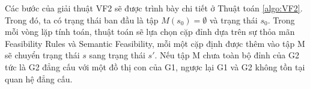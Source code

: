 \documentclass[12pt]{report}
\newenvironment{thuattoan}[1][h]
  {\renewcommand{\algorithmcfname}{Thuật toán}
   \begin{algorithm}[#1]
  }{\end{algorithm}}
\begin{document}
\newpage
\noindent Các bước của giải thuật VF2 \cite{vf2_1368} sẽ được trình bày chi tiết ở Thuật toán \ref{algo:VF2}. Trong đó, ta có trạng thái ban đầu là tập $M(s_0) = \emptyset $ và trạng thái $s_0$. Trong mỗi vòng lặp tính toán, thuật toán sẽ lựa chọn cặp đỉnh dựa trên sự thỏa mãn  Feasibility Rules và Semantic Feasibility, mỗi một cặp định được thêm vào tập M sẽ chuyển trạng thái $s$ sang trạng thái $s'$. Nếu tập M chưa toàn bộ đỉnh của G2 tức là G2 đẳng cấu với một đồ thị con của G1, ngược lại G1 và G2 không tồn tại quan hệ đẳng cấu.
%	
%	
%	
\end{document}
